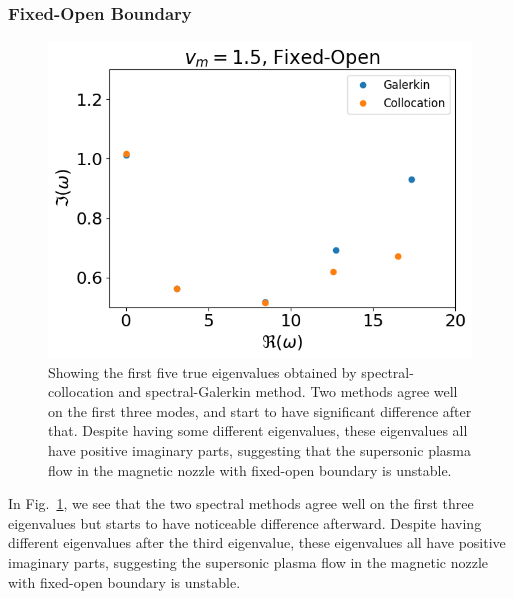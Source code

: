 \subsubsection*{Fixed-Open Boundary}
\begin{figure} [htbp!]
	\centering
	\includegraphics[width=0.7\linewidth]{figures/supersonic-fixed-open.png}
	\caption{Showing the first five true eigenvalues obtained by spectral-collocation and spectral-Galerkin method. Two methods agree well on the first three modes, and start to have significant difference after that. Despite having some different eigenvalues, these eigenvalues all have positive imaginary parts, suggesting that the supersonic plasma flow in the magnetic nozzle with fixed-open boundary is unstable.}
	\label{fig:supersonic-fixed-open}
\end{figure}
In Fig.~\ref{fig:supersonic-fixed-open}, we see that the two spectral methods agree well on the first three eigenvalues but starts to have noticeable difference afterward. Despite having different eigenvalues after the third eigenvalue, these eigenvalues all have positive imaginary parts, suggesting the supersonic plasma flow in the magnetic nozzle with fixed-open boundary is unstable.
